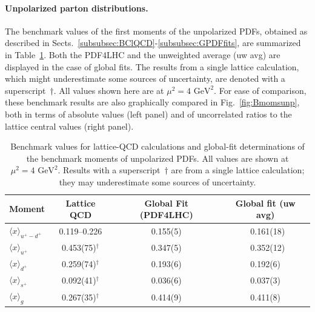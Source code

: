 \paragraph{Unpolarized parton distributions.}
%
The benchmark values of the first moments of the unpolarized PDFs, obtained
as described in Sects.~\ref{subsubsec:BClQCD}-\ref{subsubsec:GPDFfits}, 
are summarized in Table~\ref{tab:BMunp}.
%
Both the PDF4LHC and the unweighted average (uw avg) are displayed in the case 
of global fits.
%
The results from a single lattice calculation, which might underestimate some 
sources of uncertainty, are denoted with a superscript~$\dagger$.
%
All values shown here are at $\mu^2=4\mbox{ GeV}^2$.
%
For ease of comparison, these benchmark results are also graphically
compared in Fig.~\ref{fig:Bmomsunp}, both in terms of absolute values 
(left panel) and of uncorrelated ratios to the lattice central values 
(right panel).

\begin{table}[!t]
\centering
\renewcommand{\arraystretch}{1.2}
\begin{tabular}{lccc}
\toprule
Moment & Lattice QCD & Global Fit (PDF4LHC) & Global fit (uw avg)\\
\midrule
$\langle x \rangle_{u^+ -d^+}$ 
& \numrange{0.119}{0.226} 
& 0.155(5)
& \, 0.161(18)\\
$\langle x \rangle_{u^+}$     
& 0.453(75)$^\dagger$ 
& 0.347(5)
& \, 0.352(12)\\
$\langle x \rangle_{d^+}$     
& 0.259(74)$^\dagger$ 
& 0.193(6)
& 0.192(6)\\
$\langle x \rangle_{s^+}$     
& 0.092(41)$^\dagger$ 
& 0.036(6)
& 0.037(3)\\
$\langle x\rangle_{g}$       
& 0.267(35)$^\dagger$ 
& 0.414(9)
& 0.411(8)\\
\bottomrule
\end{tabular}
\caption{\small Benchmark values for lattice-QCD calculations and global-fit 
determinations of the benchmark moments of unpolarized PDFs.
%
All values are shown at $\mu^2=4\mbox{ GeV}^2$.
%
Results with a superscript~$\dagger$ are from a single lattice 
calculation; they may underestimate some sources of uncertainty.}
\label{tab:BMunp}
\end{table}

